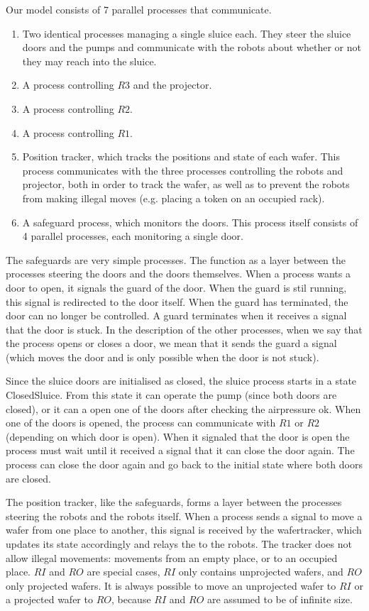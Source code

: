 
Our model consists of 7 parallel processes that communicate.
\begin{enumerate}
 \item Two identical processes managing a single sluice each. They steer the sluice doors and the pumps and communicate with the robots about whether or not they may reach into the sluice.
 \item A process controlling $R3$ and the projector.
 \item A process controlling $R2$.
 \item A process controlling $R1$.
 \item Position tracker, which tracks the positions and state of each wafer. This process communicates with the three processes controlling the robots and projector, both in order to track the wafer, as well as to prevent the robots from making illegal moves (e.g. placing a token on an occupied rack).
 \item A safeguard process, which monitors the doors. This process itself consists of 4 parallel processes, each monitoring a single door.
\end{enumerate}

The safeguards are very simple processes. The function as a layer between the processes steering the doors and the doors themselves. When a process wants a door to open, it signals the guard of the door. When the guard is stil running, this signal is redirected to the door itself. When the guard has terminated, the door can no longer be controlled. A guard terminates when it receives a signal that the door is stuck. In the description of the other processes, when we say that the process opens or closes a door, we mean that it sends the guard a signal (which moves the door and is only possible when the door is not stuck).

Since the sluice doors are initialised as closed, the sluice process starts in a state ClosedSluice. From this state it can operate the pump (since both doors are closed), or it can a open one of the doors after checking the airpressure ok. When one of the doors is opened, the process can communicate with $R1$ or $R2$ (depending on which door is open). When it signaled that the door is open the process must wait until it received a signal that it can close the door again. The process can close the door again and go back to the initial state where both doors are closed.

The position tracker, like the safeguards, forms a layer between the processes steering the robots and the robots itself. When a process sends a signal to move a wafer from one place to another, this signal is received by the wafertracker, which updates its state accordingly and relays the to the robots. The tracker does not allow illegal movements: movements from an empty place, or to an occupied place. $RI$ and $RO$ are special cases, $RI$ only contains unprojected wafers, and $RO$ only projected wafers. It is always possible to move an unprojected wafer to $RI$ or a projected wafer to $RO$, because $RI$ and $RO$ are assumed to be of infinite size.

